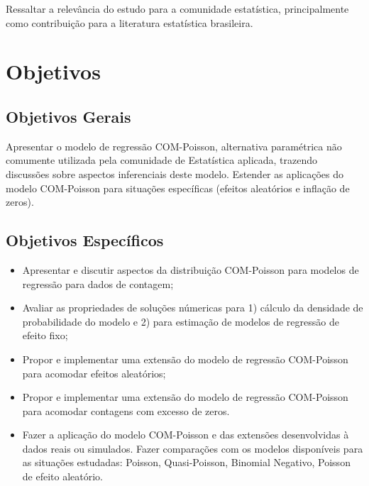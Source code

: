\documentclass[
	12pt,				%
	openright,			%
	oneside,			%
	a4paper,			%
	english,			%
	brazil,				%
	]{abntex2}
\begin{document}
Ressaltar a relevância do estudo para a comunidade estatística,
principalmente como contribuição para a literatura estatística
brasileira.

\chapter{Objetivos}
\section{Objetivos Gerais}

Apresentar o modelo de regressão COM-Poisson, alternativa 
paramétrica não comumente utilizada pela comunidade de 
Estatística aplicada, trazendo discussões sobre aspectos 
inferenciais deste modelo. Estender as aplicações do modelo
COM-Poisson para situações específicas (efeitos aleatórios 
e inflação de zeros).

\section{Objetivos Específicos}

\begin{itemize}
\item Apresentar e discutir aspectos da distribuição COM-Poisson para
  modelos de regressão para dados de contagem;
	
\item Avaliar as propriedades de soluções númericas para 1) cálculo da
  densidade de probabilidade do modelo e 2) para estimação de modelos de
  regressão de efeito fixo;
	
\item Propor e implementar uma extensão do modelo de regressão
  COM-Poisson para acomodar efeitos aleatórios;
	
\item Propor e implementar uma extensão do modelo de regressão
  COM-Poisson para acomodar contagens com excesso de zeros.
	
\item Fazer a aplicação do modelo COM-Poisson e das extensões
  desenvolvidas à dados reais ou simulados. Fazer comparações com os
  modelos disponíveis para as situações estudadas: Poisson,
  Quasi-Poisson, Binomial Negativo, Poisson de efeito aleatório.
\end{itemize}
\end{document}
